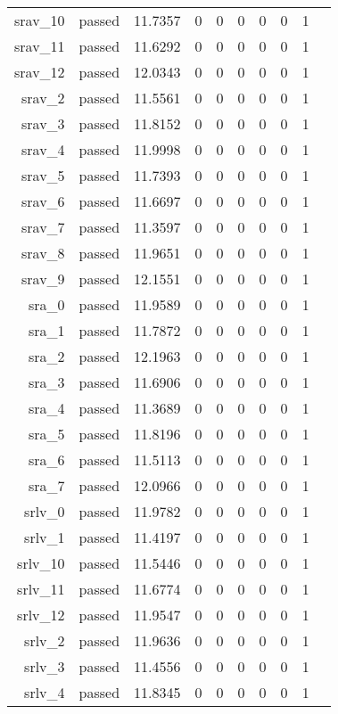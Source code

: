 \begin{longtable}{r|ccccccccc}
    srav\_10 & passed & 11.7357 & 0 & 0 & 0 & 0 & 0 & 1 \\
    srav\_11 & passed & 11.6292 & 0 & 0 & 0 & 0 & 0 & 1 \\
    srav\_12 & passed & 12.0343 & 0 & 0 & 0 & 0 & 0 & 1 \\
    srav\_2 & passed & 11.5561 & 0 & 0 & 0 & 0 & 0 & 1 \\
    srav\_3 & passed & 11.8152 & 0 & 0 & 0 & 0 & 0 & 1 \\
    srav\_4 & passed & 11.9998 & 0 & 0 & 0 & 0 & 0 & 1 \\
    srav\_5 & passed & 11.7393 & 0 & 0 & 0 & 0 & 0 & 1 \\
    srav\_6 & passed & 11.6697 & 0 & 0 & 0 & 0 & 0 & 1 \\
    srav\_7 & passed & 11.3597 & 0 & 0 & 0 & 0 & 0 & 1 \\
    srav\_8 & passed & 11.9651 & 0 & 0 & 0 & 0 & 0 & 1 \\
    srav\_9 & passed & 12.1551 & 0 & 0 & 0 & 0 & 0 & 1 \\
    sra\_0 & passed & 11.9589 & 0 & 0 & 0 & 0 & 0 & 1 \\
    sra\_1 & passed & 11.7872 & 0 & 0 & 0 & 0 & 0 & 1 \\
    sra\_2 & passed & 12.1963 & 0 & 0 & 0 & 0 & 0 & 1 \\
    sra\_3 & passed & 11.6906 & 0 & 0 & 0 & 0 & 0 & 1 \\
    sra\_4 & passed & 11.3689 & 0 & 0 & 0 & 0 & 0 & 1 \\
    sra\_5 & passed & 11.8196 & 0 & 0 & 0 & 0 & 0 & 1 \\
    sra\_6 & passed & 11.5113 & 0 & 0 & 0 & 0 & 0 & 1 \\
    sra\_7 & passed & 12.0966 & 0 & 0 & 0 & 0 & 0 & 1 \\
    srlv\_0 & passed & 11.9782 & 0 & 0 & 0 & 0 & 0 & 1 \\
    srlv\_1 & passed & 11.4197 & 0 & 0 & 0 & 0 & 0 & 1 \\
    srlv\_10 & passed & 11.5446 & 0 & 0 & 0 & 0 & 0 & 1 \\
    srlv\_11 & passed & 11.6774 & 0 & 0 & 0 & 0 & 0 & 1 \\
    srlv\_12 & passed & 11.9547 & 0 & 0 & 0 & 0 & 0 & 1 \\
    srlv\_2 & passed & 11.9636 & 0 & 0 & 0 & 0 & 0 & 1 \\
    srlv\_3 & passed & 11.4556 & 0 & 0 & 0 & 0 & 0 & 1 \\
    srlv\_4 & passed & 11.8345 & 0 & 0 & 0 & 0 & 0 & 1 \\

\end{longtable}
